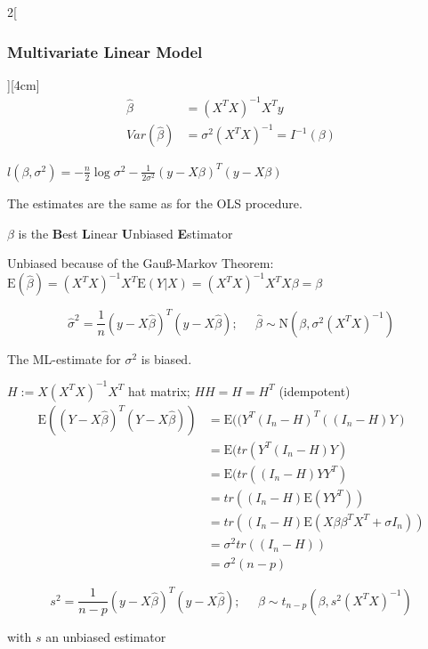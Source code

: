 \documentclass[8pt]{extarticle}
\begin{document}
\begin{multicols}{2}[\subsubsection{Multivariate Linear Model}][4cm]
\begin{align*}
\hat{\beta} &= (X^TX)^{-1}X^Ty\\
Var(\hat{\beta}) &= \sigma^2(X^TX)^{-1} = I^{-1}(\beta)
\end{align*}

\begin{Proof}
$l(\beta,\sigma^2) = -\frac{n}{2}\log\sigma^2 -\frac{1}{2\sigma^2}(y-X\beta)^T(y-X\beta)$
\end{Proof}
The estimates are the same as for the OLS procedure.

\noindent $\beta$ is the \textbf{B}est \textbf{L}inear \textbf{U}nbiased \textbf{E}stimator

\begin{Proof}
Unbiased because of the Gauß-Markov Theorem:
$\mathrm{E}(\hat{\beta}) = (X^TX)^{-1}X^T\mathrm{E}(Y|X) = (X^TX)^{-1}X^TX\beta = \beta$
\end{Proof}
$$\hat{\sigma}^2 = \frac{1}{n}(y-X\hat{\beta})^T(y-X\hat{\beta});\;\;\;\;\; \hat{\beta} \sim \mathrm{N}(\beta,\sigma^2(X^TX)^{-1})$$

The ML-estimate for $\sigma^2$ is biased.

\begin{Proof}
$H{:=}X(X^TX)^{-1}X^T$ hat matrix; $HH{=}H{=}H^T$ (idempotent)
\begin{align*}
\mathrm{E}((Y{-}X\hat{\beta})^T(Y{-}X\hat{\beta})) &= \mathrm{E}((Y^T(I_n{-}H)^T((I_n{-}H)Y)\\
&= \mathrm{E}(tr(Y^T(I_n{-}H)Y)\\
&= \mathrm{E}(tr((I_n{-}H)YY^T)\\
&= tr((I_n{-}H)\mathrm{E}(YY^T))\\
&= tr((I_n{-}H)\mathrm{E}(X\beta\beta^TX^T + \sigma I_n))\\
&= \sigma^2tr((I_n{-}H))\\
&= \sigma^2 (n-p)
\end{align*}
\end{Proof}

$$s^2 = \frac{1}{n-p}(y-X\hat{\beta})^T(y-X\hat{\beta});\;\;\;\;\; \hat{\beta} \sim t_{n-p}(\beta,s^2(X^TX)^{-1})$$

with $s$ an unbiased estimator

\end{multicols}

\end{document}
